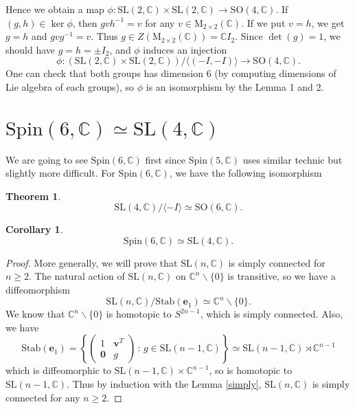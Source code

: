 \documentclass{article}
\newtheorem{theorem}{Theorem}
\newtheorem{corollary}{Corollary}
\newcommand{\SO}{\mathrm{SO}}
\newcommand{\SL}{\mathrm{SL}}
\newcommand{\Spin}{\mathrm{Spin}}
\newcommand{\Stab}{\mathrm{Stab}}
\newcommand{\Ma}{\mathrm{M}}
\begin{document}
Hence we obtain a map $\phi:\SL(2, \mathbb{C})\times \SL(2, \mathbb{C})\to \SO(4, \mathbb{C})$. 
If $(g, h)\in \ker\phi$, then $gvh^{-1} = v$ for any $v\in \Ma_{2\times 2}(\mathbb{C})$. If we put $v = h$, we get $g = h$ and $gvg^{-1} = v$. Thus $g\in Z(\Ma_{2\times 2}(\mathbb{C})) = \mathbb{C}I_{2}$. 
Since $\det(g) = 1$, we should have $g = h = \pm I_{2}$, and $\phi$ induces an injection 
$$
\phi:(\SL(2, \mathbb{C})\times\SL(2, \mathbb{C})) / \langle (-I, -I)\rangle \to  \SO(4, \mathbb{C}). 
$$
One can check that both groups has dimension 6 (by computing dimensions of Lie algebra of each groups), so $\phi$ is an isomorphism by the Lemma 1 and 2. 




\section{$\Spin(6, \mathbb{C})\simeq \SL(4, \mathbb{C})$}
We are going to see $\Spin(6, \mathbb{C})$ first since $\Spin(5, \mathbb{C})$ uses similar technic but slightly more difficult. 
For $\Spin(6, \mathbb{C})$, we have the following isomorphism
\begin{theorem}
$$\SL(4, \mathbb{C})/\langle -I\rangle \simeq \SO(6, \mathbb{C}).$$
\end{theorem}
\begin{corollary}
$$
\Spin(6, \mathbb{C})\simeq \SL(4, \mathbb{C}). 
$$
\end{corollary}

\begin{proof}
More generally, we will prove that $\SL(n, \mathbb{C})$ is simply connected for $n\geq 2$. 
The natural action of $\SL(n, \mathbb{C})$ on $\mathbb{C}^{n}\backslash \{0\}$ is transitive, so we have a diffeomorphism 
$$
\SL(n, \mathbb{C})/\Stab(\mathbf{e}_{1}) \simeq \mathbb{C}^{n}\backslash \{0\}. 
$$
We know that $\mathbb{C}^{n}\backslash \{0\}$ is homotopic to $S^{2n-1}$, which is simply connected. 
Also, we have
$$
\Stab(\mathbf{e}_{1}) = \left\{\begin{pmatrix} 1 & \mathbf{v}^{T} \\ \mathbf{0} & g\end{pmatrix}\,:\, g\in \SL(n-1, \mathbb{C})\right\}\simeq \SL(n-1, \mathbb{C}) \rtimes\mathbb{C}^{n-1}
$$
which is diffeomorphic to $\SL(n-1, \mathbb{C})\times \mathbb{C}^{n-1}$, so is homotopic to $\SL(n-1, \mathbb{C})$. 
Thus by induction with the Lemma \ref{simply}, $\SL(n, \mathbb{C})$ is simply connected for any $n\geq 2$. 
\end{proof}
\end{document}

